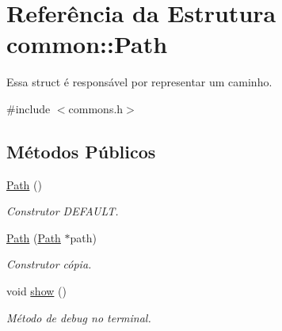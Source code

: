 \hypertarget{structcommon_1_1Path}{}\section{Referência da Estrutura common\+:\+:Path}
\label{structcommon_1_1Path}


Essa struct é responsável por representar um caminho.  




{\ttfamily \#include $<$commons.\+h$>$}

\subsection*{Métodos Públicos}
\begin{DoxyCompactItemize}
\item 
\hyperlink{structcommon_1_1Path_aa594e5d456d0ec2357d302cb5c898043}{Path} ()\hypertarget{structcommon_1_1Path_aa594e5d456d0ec2357d302cb5c898043}{}\label{structcommon_1_1Path_aa594e5d456d0ec2357d302cb5c898043}

\begin{DoxyCompactList}\small\item\em Construtor D\+E\+F\+A\+U\+LT. \end{DoxyCompactList}\item 
\hyperlink{structcommon_1_1Path_adc2653fd1a8605ddef65cb96c814b423}{Path} (\hyperlink{structcommon_1_1Path}{Path} $\ast$path)\hypertarget{structcommon_1_1Path_adc2653fd1a8605ddef65cb96c814b423}{}\label{structcommon_1_1Path_adc2653fd1a8605ddef65cb96c814b423}

\begin{DoxyCompactList}\small\item\em Construtor cópia. \end{DoxyCompactList}\item 
void \hyperlink{structcommon_1_1Path_a1258d2f94073ac9d2995617ff7d2ac46}{show} ()\hypertarget{structcommon_1_1Path_a1258d2f94073ac9d2995617ff7d2ac46}{}\label{structcommon_1_1Path_a1258d2f94073ac9d2995617ff7d2ac46}

\begin{DoxyCompactList}\small\item\em Método de debug no terminal. \end{DoxyCompactList}\end{DoxyCompactItemize}
